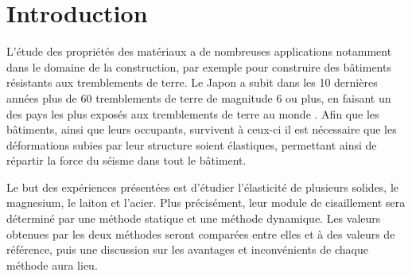 \section{Introduction}

L'étude des propriétés des matériaux a de nombreuses applications notamment dans le domaine de la construction, par exemple pour construire des bâtiments résistants aux tremblements de terre. Le Japon a subit dans les 10 dernières années plus de 60 tremblements de terre de magnitude 6 ou plus, en faisant un des pays les plus exposés aux tremblements de terre au monde \cite{japan_shakey}. Afin que les bâtiments, ainsi que leurs occupants, survivent à ceux-ci il est nécessaire que les déformations subies par leur structure soient élastiques, permettant ainsi de répartir la force du séisme dans tout le bâtiment.

Le but des expériences présentées est d'étudier l'élasticité de plusieurs solides, le magnesium, le laiton et l'acier. Plus précisément, leur module de cisaillement sera déterminé par une méthode statique et une méthode dynamique. Les valeurs obtenues par les deux méthodes seront comparées entre elles et à des valeurs de référence, puis une discussion sur les avantages et inconvénients de chaque méthode aura lieu.
